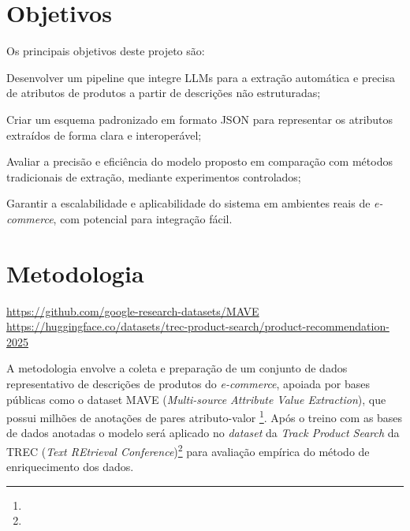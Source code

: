 \section{Objetivos} %


Os principais objetivos deste projeto são:
\begin{enumerate*}
    \item Desenvolver um pipeline que integre LLMs para a extração automática e precisa de atributos de produtos a partir de descrições não estruturadas;
    \item Criar um esquema padronizado em formato JSON para representar os atributos extraídos de forma clara e interoperável;
    \item Avaliar a precisão e eficiência do modelo proposto em comparação com métodos tradicionais de extração, mediante experimentos controlados;
    \item Garantir a escalabilidade e aplicabilidade do sistema em ambientes reais de \textit{e-commerce}, com potencial para integração fácil.
\end{enumerate*}

\section{Metodologia} %

\urldef\maveurl\url{https://github.com/google-research-datasets/MAVE}
\urldef\trecurl\url{https://huggingface.co/datasets/trec-product-search/product-recommendation-2025}

A metodologia envolve a coleta e preparação de um conjunto de dados representativo de descrições de produtos do \textit{e-commerce}, apoiada por bases públicas como o dataset MAVE (\textit{Multi-source Attribute Value Extraction}), que possui milhões de anotações de pares atributo-valor \citet{MAVE2024}\footnote{\maveurl}. Após o treino com as bases de dados anotadas o modelo será aplicado no \textit{dataset} da \textit{Track Product Search} da TREC (\textit{Text REtrieval Conference})\footnote{\trecurl} \citet{TRECProductSearch_2023} para avaliação empírica do método de enriquecimento dos dados.

